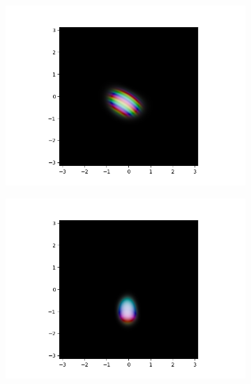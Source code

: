\documentclass[11pt, a4paper, oneside]{article}
\begin{document}
\begin{appendices}
\begin{figure}[h]
\begin{subfigure}[b]{0.5 \textwidth}
  \end{subfigure}
  \hfill
  \begin{subfigure}[b]{0.5 \textwidth}
    \includegraphics[width = \textwidth]{graphics/torsional/wavefunction_contour_block_0_level_0_timestep_0000200.PNG}
  \end{subfigure}
  \hfill
  \begin{subfigure}[b]{0.5 \textwidth}
    \includegraphics[width = \textwidth]{graphics/torsional/wavefunction_contour_block_0_level_0_timestep_0000300.PNG}
  \end{subfigure}
  \hfill
  \begin{subfigure}[b]{0.5 \textwidth}

\end{subfigure}
\end{figure}
\end{appendices}
\end{document}
